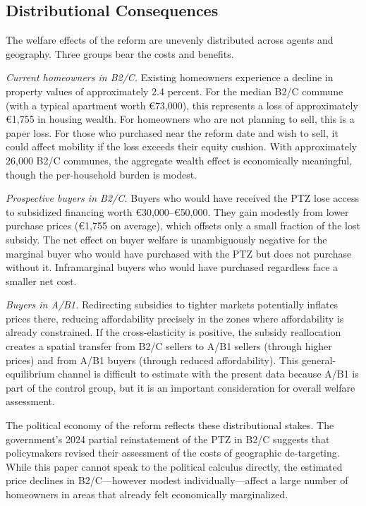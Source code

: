 \documentclass[12pt]{article}
\begin{document}
\subsection{Distributional Consequences}

The welfare effects of the reform are unevenly distributed across agents and geography. Three groups bear the costs and benefits.

\textit{Current homeowners in B2/C.} Existing homeowners experience a decline in property values of approximately 2.4 percent. For the median B2/C commune (with a typical apartment worth \euro{73,000}), this represents a loss of approximately \euro{1,755} in housing wealth. For homeowners who are not planning to sell, this is a paper loss. For those who purchased near the reform date and wish to sell, it could affect mobility if the loss exceeds their equity cushion. With approximately 26,000 B2/C communes, the aggregate wealth effect is economically meaningful, though the per-household burden is modest.

\textit{Prospective buyers in B2/C.} Buyers who would have received the PTZ lose access to subsidized financing worth \euro{30,000}--\euro{50,000}. They gain modestly from lower purchase prices (\euro{1,755} on average), which offsets only a small fraction of the lost subsidy. The net effect on buyer welfare is unambiguously negative for the marginal buyer who would have purchased with the PTZ but does not purchase without it. Inframarginal buyers who would have purchased regardless face a smaller net cost.

\textit{Buyers in A/B1.} Redirecting subsidies to tighter markets potentially inflates prices there, reducing affordability precisely in the zones where affordability is already constrained. If the cross-elasticity is positive, the subsidy reallocation creates a spatial transfer from B2/C sellers to A/B1 sellers (through higher prices) and from A/B1 buyers (through reduced affordability). This general-equilibrium channel is difficult to estimate with the present data because A/B1 is part of the control group, but it is an important consideration for overall welfare assessment.

The political economy of the reform reflects these distributional stakes. The government's 2024 partial reinstatement of the PTZ in B2/C suggests that policymakers revised their assessment of the costs of geographic de-targeting. While this paper cannot speak to the political calculus directly, the estimated price declines in B2/C---however modest individually---affect a large number of homeowners in areas that already felt economically marginalized.
\end{document}
